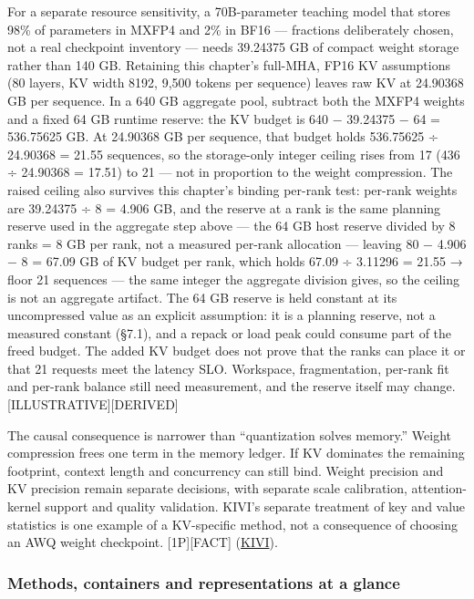 For a separate resource sensitivity, a 70B-parameter teaching model that
stores 98\% of parameters in MXFP4 and 2\% in BF16 --- fractions
deliberately chosen, not a real checkpoint inventory --- needs 39.24375
GB of compact weight storage rather than 140 GB. Retaining this
chapter's full-MHA, FP16 KV assumptions (80 layers, KV width 8192, 9,500
tokens per sequence) leaves raw KV at 24.90368 GB per sequence. In a 640
GB aggregate pool, subtract both the MXFP4 weights and a fixed 64 GB
runtime reserve: the KV budget is 640 − 39.24375 − 64 = 536.75625 GB. At
24.90368 GB per sequence, that budget holds 536.75625 ÷ 24.90368 = 21.55
sequences, so the storage-only integer ceiling rises from 17 (436 ÷
24.90368 = 17.51) to 21 --- not in proportion to the weight compression.
The raised ceiling also survives this chapter's binding per-rank test:
per-rank weights are 39.24375 ÷ 8 = 4.906 GB, and the reserve at a rank
is the same planning reserve used in the aggregate step above --- the 64
GB host reserve divided by 8 ranks = 8 GB per rank, not a measured
per-rank allocation --- leaving 80 − 4.906 − 8 = 67.09 GB of KV budget
per rank, which holds 67.09 ÷ 3.11296 = 21.55 → floor 21 sequences ---
the same integer the aggregate division gives, so the ceiling is not an
aggregate artifact. The 64 GB reserve is held constant at its
uncompressed value as an explicit assumption: it is a planning reserve,
not a measured constant (§7.1), and a repack or load peak could consume
part of the freed budget. The added KV budget does not prove that the
ranks can place it or that 21 requests meet the latency SLO. Workspace,
fragmentation, per-rank fit and per-rank balance still need measurement,
and the reserve itself may change. \mbox{{[}ILLUSTRATIVE{]}}\hspace{0pt}\mbox{{[}DERIVED{]}}

The causal consequence is narrower than ``quantization solves memory.''
Weight compression frees one term in the memory ledger. If KV dominates
the remaining footprint, context length and concurrency can still bind.
Weight precision and KV precision remain separate decisions, with
separate scale calibration, attention-kernel support and quality
validation. KIVI's separate treatment of key and value statistics is one
example of a KV-specific method, not a consequence of choosing an AWQ
weight checkpoint. \mbox{{[}1P{]}}\hspace{0pt}\mbox{{[}FACT{]}}
(\href{https://arxiv.org/abs/2402.02750v2}{KIVI}).

\subsubsection{Methods, containers and representations at a
glance}\label{methods-containers-and-representations-at-a-glance}

